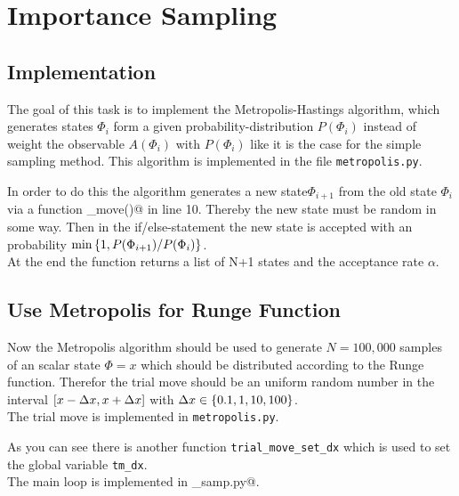 \section{Importance Sampling}

\subsection{Implementation}

The goal of this task is to implement the Metropolis-Hastings algorithm, which generates states $\Phi_i$ form a given probability-distribution $P(\Phi_i)$ instead of weight the observable $A(\Phi_i)$ with $P(\Phi_i)$ like it is the case for the simple sampling method.
This algorithm is implemented in the file \lstinline|metropolis.py|.


In order to do this the algorithm generates a new state$\Phi_{i+1}$ from the old state $\Phi_i$ via a function \lstinline@trial_move()@ in line 10.
Thereby the new state must be random in some way.
Then in the if/else-statement the new state is accepted with an probability $\min \left\lbrace 1,P(\Phi_{i+1})/P(\Phi_i)\right\rbrace$.\\

At the end the function returns a list of N+1 states and the acceptance rate $\alpha$.

\subsection{Use Metropolis for Runge Function}

Now the Metropolis algorithm should be used to generate $N=100 ,000$ samples of an scalar state $\Phi =x$ which should be distributed according to the Runge function.
Therefor the trial move should be an uniform random number in the interval $[x-\Delta x, x+\Delta x]$ with $\Delta x\in \left\lbrace 0.1, 1, 10, 100\right\rbrace$.\\

The trial move is implemented in \lstinline|metropolis.py|.


As you can see there is another function \lstinline|trial_move_set_dx| which is used to set the global variable \lstinline|tm_dx|.\\

The main loop is implemented in \lstinline@imp_samp.py@.

